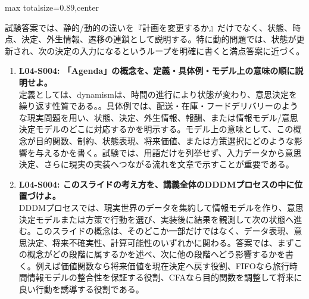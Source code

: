 \begin{minipage}[t]{0.58\textwidth}
\begin{adjustbox}{max totalsize={\textwidth}{0.89\textheight},center}
\begin{minipage}{\textwidth}
試験答案では、静的/動的の違いを『計画を変更するか』だけでなく、状態、時点、決定、外生情報、遷移の連鎖として説明する。特に動的問題では、状態が更新され、次の決定の入力になるというループを明確に書くと満点答案に近づく。\par{}\begin{enumerate}\item \textbf{L04-S004: 「Agenda」の概念を、定義・具体例・モデル上の意味の順に説明せよ。}\\定義としては、dynamismは、時間の進行により状態が変わり、意思決定を繰り返す性質である。。具体例では、配送・在庫・フードデリバリーのような現実問題を用い、状態、決定、外生情報、報酬、または情報モデル/意思決定モデルのどこに対応するかを明示する。モデル上の意味として、この概念が目的関数、制約、状態表現、将来価値、または方策選択にどのような影響を与えるかを書く。試験では、用語だけを列挙せず、入力データから意思決定、さらに現実の実装へつながる流れを文章で示すことが重要である。\item \textbf{L04-S004: このスライドの考え方を、講義全体のDDDMプロセスの中に位置づけよ。}\\DDDMプロセスでは、現実世界のデータを集約して情報モデルを作り、意思決定モデルまたは方策で行動を選び、実装後に結果を観測して次の状態へ進む。このスライドの概念は、そのどこか一部だけではなく、データ表現、意思決定、将来不確実性、計算可能性のいずれかに関わる。答案では、まずこの概念がどの段階に属するかを述べ、次に他の段階へどう影響するかを書く。例えば価値関数なら将来価値を現在決定へ戻す役割、FIFOなら旅行時間情報モデルの整合性を保証する役割、CFAなら目的関数を調整して将来に良い行動を誘導する役割である。\end{enumerate}
\end{minipage}
\end{adjustbox}
\end{minipage}


